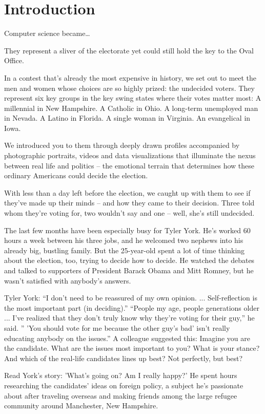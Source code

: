 \documentclass[%
        TwoSidePages,%
        English,%
        FinalVersion,%
        Copyright,%
        TablesPage,%
        FiguresPage,%
        ]%
{ic-tese-v2}
\begin{document}
\chapter{Introduction}
Computer science became\ldots

They represent a sliver of the electorate yet could still hold the key to the Oval Office.

In a contest that's already the most expensive in history, we set out to meet the men and women whose choices are so highly prized: the undecided voters.
They represent six key groups in the key swing states where their votes matter most:
A millennial in New Hampshire. A Catholic in Ohio. A long-term unemployed man in Nevada. A Latino in Florida. A single woman in Virginia. An evangelical in Iowa.

We introduced you to them through deeply drawn profiles accompanied by photographic portraits, videos and data visualizations that illuminate the nexus between real life and politics -- the emotional terrain that determines how these ordinary Americans could decide the election.

With less than a day left before the election, we caught up with them to see if they've made up their minds -- and how they came to their decision. Three told whom they're voting for, two wouldn't say and one -- well, she's still undecided.

The last few months have been especially busy for Tyler York. He's worked 60 hours a week between his three jobs, and he welcomed two nephews into his already big, bustling family.
But the 25-year-old spent a lot of time thinking about the election, too, trying to decide how to decide. He watched the debates and talked to supporters of President Barack Obama and Mitt Romney, but he wasn't satisfied with anybody's answers.

Tyler York: ``I don't need to be reassured of my own opinion. ... Self-reflection is the most important part (in deciding).''
``People my age, people generations older ... I've realized that they don't truly know why they're voting for their guy,'' he said. '' 'You should vote for me because the other guy's bad' isn't really educating anybody on the issues.''
A colleague suggested this: Imagine you are the candidate. What are the issues most important to you? What is your stance? And which of the real-life candidates lines up best? Not perfectly, but best?

Read York's story: 'What's going on? Am I really happy?'
He spent hours researching the candidates' ideas on foreign policy, a subject he's passionate about after traveling overseas and making friends among the large refugee community around Manchester, New Hampshire.
\end{document}
